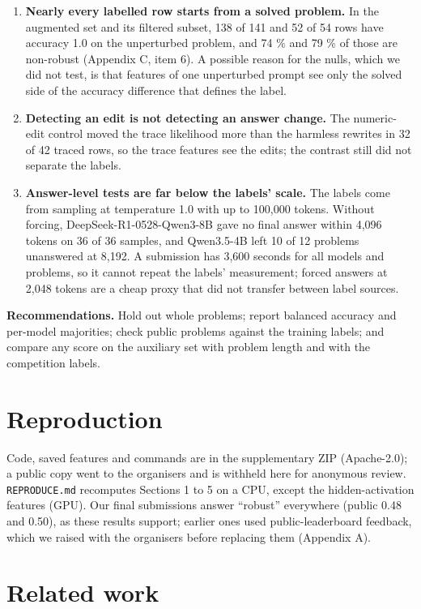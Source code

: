 \documentclass{article}
\providecommand{\tightlist}{\setlength{\itemsep}{0pt}\setlength{\parskip}{0pt}}
\begin{document}
\begin{enumerate}
\def\labelenumi{\arabic{enumi}.}
\tightlist
\item
  \textbf{Nearly every labelled row starts from a solved problem.} In the augmented set and its filtered subset, 138 of 141 and 52 of 54 rows have accuracy 1.0 on the unperturbed problem, and 74 \% and 79 \% of those are non-robust (Appendix C, item 6). A possible reason for the nulls, which we did not test, is that features of one unperturbed prompt see only the solved side of the accuracy difference that defines the label.
\item
  \textbf{Detecting an edit is not detecting an answer change.} The numeric-edit control moved the trace likelihood more than the harmless rewrites in 32 of 42 traced rows, so the trace features see the edits; the contrast still did not separate the labels.
\item
  \textbf{Answer-level tests are far below the labels' scale.} The labels come from sampling at temperature 1.0 with up to 100,000 tokens. Without forcing, DeepSeek-R1-0528-Qwen3-8B gave no final answer within 4,096 tokens on 36 of 36 samples, and Qwen3.5-4B left 10 of 12 problems unanswered at 8,192. A submission has 3,600 seconds for all models and problems, so it cannot repeat the labels' measurement; forced answers at 2,048 tokens are a cheap proxy that did not transfer between label sources.
\end{enumerate}

\textbf{Recommendations.} Hold out whole problems; report balanced accuracy and per-model majorities; check public problems against the training labels; and compare any score on the auxiliary set with problem length and with the competition labels.

\section{Reproduction}

Code, saved features and commands are in the supplementary ZIP (Apache-2.0); a public copy went to the organisers and is withheld here for anonymous review. \texttt{REPRODUCE.md} recomputes Sections 1 to 5 on a CPU, except the hidden-activation features (GPU). Our final submissions answer ``robust'' everywhere (public 0.48 and 0.50), as these results support; earlier ones used public-leaderboard feedback, which we raised with the organisers before replacing them (Appendix A).

\section*{Related work}
\end{document}
